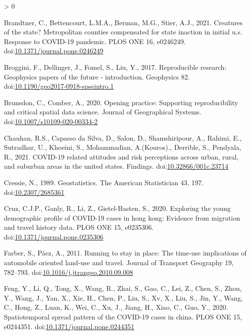 \documentclass[]{elsarticle} %
\newlength{\cslhangindent}
\newenvironment{CSLReferences}[2] %
 {%
  \setlength{\parindent}{0pt}
  \ifodd #1 \everypar{\setlength{\hangindent}{\cslhangindent}}\ignorespaces\fi
  \ifnum #2 > 0
  \setlength{\parskip}{#2\baselineskip}
  \fi
 }%
 {}
\begin{document}
\begin{CSLReferences}{1}{0}
\leavevmode\hypertarget{ref-Brandtner2021creatures}{}%
Brandtner, C., Bettencourt, L.M.A., Berman, M.G., Stier, A.J., 2021.
Creatures of the state? Metropolitan counties compensated for state
inaction in initial u.s. Response to COVID-19 pandemic. PLOS ONE 16,
e0246249.
doi:\href{https://doi.org/10.1371/journal.pone.0246249}{10.1371/journal.pone.0246249}

\leavevmode\hypertarget{ref-Broggini2017reproducible}{}%
Broggini, F., Dellinger, J., Fomel, S., Liu, Y., 2017. Reproducible
research: Geophysics papers of the future - introduction. Geophysics 82.
doi:\href{https://doi.org/10.1190/geo2017-0918-spseintro.1}{10.1190/geo2017-0918-spseintro.1}

\leavevmode\hypertarget{ref-Brunsdon2020opening}{}%
Brunsdon, C., Comber, A., 2020. Opening practice: Supporting
reproducibility and critical spatial data science. Journal of
Geographical Systems.
doi:\href{https://doi.org/10.1007/s10109-020-00334-2}{10.1007/s10109-020-00334-2}

\leavevmode\hypertarget{ref-Chauhan2021covid}{}%
Chauhan, R.S., Capasso da Silva, D., Salon, D., Shamshiripour, A.,
Rahimi, E., Sutradhar, U., Khoeini, S., Mohammadian, A.(Kouros).,
Derrible, S., Pendyala, R., 2021. COVID-19 related attitudes and risk
perceptions across urban, rural, and suburban areas in the united
states. Findings.
doi:\href{https://doi.org/10.32866/001c.23714}{10.32866/001c.23714}

\leavevmode\hypertarget{ref-Cressie1989geostatistics}{}%
Cressie, N., 1989. Geostatistics. The American Statistician 43, 197.
doi:\href{https://doi.org/10.2307/2685361}{10.2307/2685361}

\leavevmode\hypertarget{ref-Cruz2020exploring}{}%
Cruz, C.J.P., Ganly, R., Li, Z., Gietel-Basten, S., 2020. Exploring the
young demographic profile of COVID-19 cases in hong kong: Evidence from
migration and travel history data. PLOS ONE 15, e0235306.
doi:\href{https://doi.org/10.1371/journal.pone.0235306}{10.1371/journal.pone.0235306}

\leavevmode\hypertarget{ref-Farber2011running}{}%
Farber, S., Páez, A., 2011. Running to stay in place: The time-use
implications of automobile oriented land-use and travel. Journal of
Transport Geography 19, 782--793.
doi:\href{https://doi.org/10.1016/j.jtrangeo.2010.09.008}{10.1016/j.jtrangeo.2010.09.008}

\leavevmode\hypertarget{ref-Feng2020spread}{}%
Feng, Y., Li, Q., Tong, X., Wang, R., Zhai, S., Gao, C., Lei, Z., Chen,
S., Zhou, Y., Wang, J., Yan, X., Xie, H., Chen, P., Liu, S., Xv, X.,
Liu, S., Jin, Y., Wang, C., Hong, Z., Luan, K., Wei, C., Xu, J., Jiang,
H., Xiao, C., Guo, Y., 2020. Spatiotemporal spread pattern of the
COVID-19 cases in china. PLOS ONE 15, e0244351.
doi:\href{https://doi.org/10.1371/journal.pone.0244351}{10.1371/journal.pone.0244351}


\end{CSLReferences}
\end{document}
